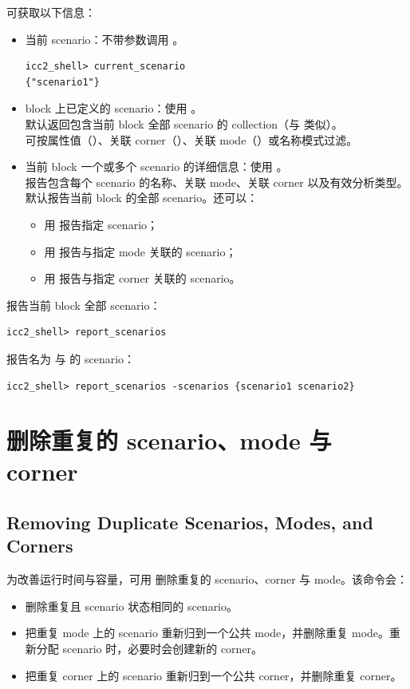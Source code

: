 可获取以下信息：
\begin{itemize}
  \item 当前 scenario：不带参数调用 。
\begin{lstlisting}
icc2_shell> current_scenario
{"scenario1"}
\end{lstlisting}
  \item block 上已定义的 scenario：使用 。\\
        默认返回包含当前 block 全部 scenario 的 collection（与  类似）。\\
        可按属性值（）、关联 corner（）、关联 mode（）或名称模式过滤。
  \item 当前 block 一个或多个 scenario 的详细信息：使用 。\\
        报告包含每个 scenario 的名称、关联 mode、关联 corner 以及有效分析类型。\\
        默认报告当前 block 的全部 scenario。还可以：
  \begin{itemize}
    \item 用  报告指定 scenario；
    \item 用  报告与指定 mode 关联的 scenario；
    \item 用  报告与指定 corner 关联的 scenario。
  \end{itemize}
\end{itemize}

报告当前 block 全部 scenario：
\begin{lstlisting}
icc2_shell> report_scenarios
\end{lstlisting}

报告名为  与  的 scenario：
\begin{lstlisting}
icc2_shell> report_scenarios -scenarios {scenario1 scenario2}
\end{lstlisting}

\section{删除重复的 scenario、mode 与 corner}
\subsection*{Removing Duplicate Scenarios, Modes, and Corners}

为改善运行时间与容量，可用  删除重复的 scenario、corner 与 mode。该命令会：
\begin{itemize}
  \item 删除重复且 scenario 状态相同的 scenario。
  \item 把重复 mode 上的 scenario 重新归到一个公共 mode，并删除重复 mode。重新分配 scenario 时，必要时会创建新的 corner。
  \item 把重复 corner 上的 scenario 重新归到一个公共 corner，并删除重复 corner。
\end{itemize}

